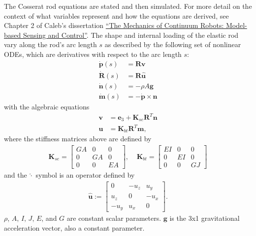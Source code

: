 \documentclass[12pt]{article}
\begin{document}
\makeatletter
\renewcommand{\@maketitle}{
\newpage
\null
\vskip 2em
\begin{center}
{\LARGE \@title \par}
\end{center}
\par
} \makeatother

\maketitle

The Cosserat rod equations are stated and then simulated. For more detail on the context of what variables represent and how the equations are derived, see Chapter 2 of Caleb's dissertation \href{https://etd.library.vanderbilt.edu//available/etd-10042011-115347/}{``The Mechanics of Continuum Robots: Model-based Sensing and Control''}. The shape and internal loading of the elastic rod vary along the rod's arc length $s$ as described by the following set of nonlinear ODEs, which are derivatives with respect to the arc length $s$:
\begin{align*}
\dot{\boldsymbol{p}}(s) &= \boldsymbol{R} \boldsymbol{v} \\
\dot{\boldsymbol{R}}(s) &= \boldsymbol{R} \widehat{\boldsymbol{u}} \\
\dot{\boldsymbol{n}}(s) &= -\rho A \boldsymbol{g} \\
\dot{\boldsymbol{m}}(s) &= - \dot{\boldsymbol{p}} \times \boldsymbol{n}
\end{align*}
with the algebraic equations
\begin{align*}
\boldsymbol{v} &= \boldsymbol{e}_3 + \boldsymbol{K}_{se} \boldsymbol{R}^T \boldsymbol{n} \\
\boldsymbol{u} &= \boldsymbol{K}_{bt} \boldsymbol{R}^T \boldsymbol{m},
\end{align*}
where the stiffness matrices above are defined by
\begin{align*}
\boldsymbol{K}_{se} = \begin{bmatrix} GA & 0 & 0 \\ 0 & GA & 0 \\ 0 & 0 & EA \end{bmatrix}, \;\;\;\;
\boldsymbol{K}_{bt} = \begin{bmatrix} EI & 0 & 0 \\ 0 & EI & 0 \\ 0 & 0 & GJ \end{bmatrix}
\end{align*}
and the $\widehat{\cdot}$ symbol is an operator defined by
\begin{align*}
\widehat{\boldsymbol{u}} := \begin{bmatrix} 0 & -u_z & u_y \\ u_z & 0 & -u_x \\ -u_y & u_x & 0 \end{bmatrix}.
\end{align*}
$\rho$, $A$, $I$, $J$, $E$, and $G$ are constant scalar parameters. $\boldsymbol{g}$ is the 3x1 gravitational acceleration vector, also a constant parameter.
\end{document}
